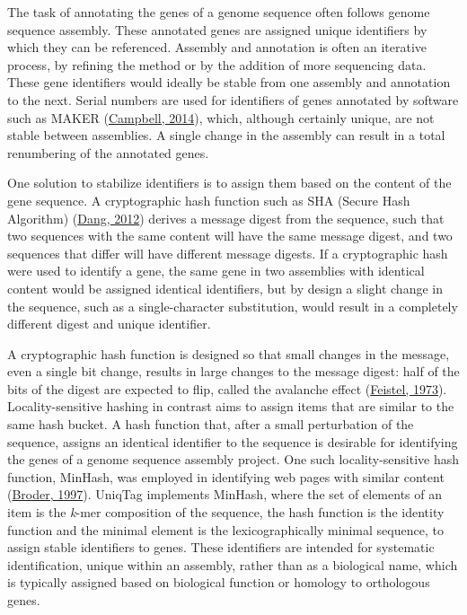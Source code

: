 \documentclass{bioinfo}
\begin{document}
The task of annotating the genes of a genome sequence often follows
genome sequence assembly. These annotated genes are assigned unique
identifiers by which they can be referenced. Assembly and annotation is
often an iterative process, by refining the method or by the addition of
more sequencing data. These gene identifiers would ideally be stable
from one assembly and annotation to the next. Serial numbers are used
for identifiers of genes annotated by software such as MAKER
(\href{http://dx.doi.org/10.1104/pp.113.230144}{Campbell, 2014}), which,
although certainly unique, are not stable between assemblies. A single
change in the assembly can result in a total renumbering of the
annotated genes.

One solution to stabilize identifiers is to assign them based on the
content of the gene sequence. A cryptographic hash function such as SHA
(Secure Hash Algorithm)
(\href{http://www.nist.gov/manuscript-publication-search.cfm?pub_id=910977}{Dang,
2012}) derives a message digest from the sequence, such that two
sequences with the same content will have the same message digest, and
two sequences that differ will have different message digests. If a
cryptographic hash were used to identify a gene, the same gene in two
assemblies with identical content would be assigned identical
identifiers, but by design a slight change in the sequence, such as a
single-character substitution, would result in a completely different
digest and unique identifier.

A cryptographic hash function is designed so that small changes in the
message, even a single bit change, results in large changes to the
message digest: half of the bits of the digest are expected to flip,
called the avalanche effect
(\href{http://www.scientificamerican.com/article/cryptography-and-computer-privacy/}{Feistel,
1973}). Locality-sensitive hashing in contrast aims to assign items that
are similar to the same hash bucket. A hash function that, after a small
perturbation of the sequence, assigns an identical identifier to the
sequence is desirable for identifying the genes of a genome sequence
assembly project. One such locality-sensitive hash function, MinHash,
was employed in identifying web pages with similar content
(\href{http://dx.doi.org/10.1109/SEQUEN.1997.666900}{Broder, 1997}).
UniqTag implements MinHash, where the set of elements of an item is the
\emph{k}-mer composition of the sequence, the hash function is the
identity function and the minimal element is the lexicographically
minimal sequence, to assign stable identifiers to genes. These
identifiers are intended for systematic identification, unique within an
assembly, rather than as a biological name, which is typically assigned
based on biological function or homology to orthologous genes.
\end{document}
